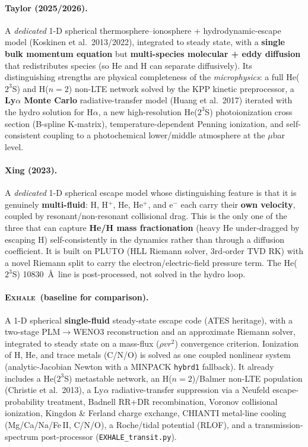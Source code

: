 \documentclass[11pt]{article}
\newcommand{\EXHALE}{\textsc{Exhale}}
\begin{document}
\paragraph{Taylor (2025/2026).} A \emph{dedicated} 1-D spherical thermosphere--ionosphere +
hydrodynamic-escape model (Koskinen et al.\ 2013/2022), integrated to steady state, with a
\textbf{single bulk momentum equation} but \textbf{multi-species molecular + eddy diffusion}
that redistributes species (so He and H can separate diffusively). Its distinguishing
strengths are physical completeness of the \emph{microphysics}: a full He($2^3$S) and
H($n{=}2$) non-LTE network solved by the KPP kinetic preprocessor, a \textbf{Ly$\alpha$
Monte Carlo} radiative-transfer model (Huang et al.\ 2017) iterated with the hydro solution
for H$\alpha$, a new high-resolution He($2^3$S) photoionization cross section (B-spline
K-matrix), temperature-dependent Penning ionization, and self-consistent coupling to a
photochemical lower/middle atmosphere at the $\mu$bar level.

\paragraph{Xing (2023).} A \emph{dedicated} 1-D spherical escape model whose distinguishing
feature is that it is genuinely \textbf{multi-fluid}: H, H$^+$, He, He$^+$, and e$^-$ each
carry their \textbf{own velocity}, coupled by resonant/non-resonant collisional drag. This
is the only one of the three that can capture \textbf{He/H mass fractionation} (heavy He
under-dragged by escaping H) self-consistently in the dynamics rather than through a
diffusion coefficient. It is built on PLUTO (HLL Riemann solver, 3rd-order TVD RK) with a
novel Riemann split to carry the electron/electric-field pressure term. The He($2^3$S)
10830~\AA\ line is post-processed, not solved in the hydro loop.

\paragraph{\EXHALE\ (baseline for comparison).} A 1-D spherical \textbf{single-fluid}
steady-state escape code (ATES heritage), with a two-stage PLM$\rightarrow$WENO3
reconstruction and an approximate Riemann solver, integrated to steady state on a mass-flux
($\rho v r^2$) convergence criterion. Ionization of H, He, and trace metals (C/N/O) is solved
as one coupled nonlinear system (analytic-Jacobian Newton with a MINPACK \texttt{hybrd1}
fallback). It already includes a He($2^3$S) metastable network, an H($n{=}2$)/Balmer non-LTE
population (Christie et al.\ 2013), a Ly$\alpha$ radiative-transfer suppression via a Neufeld
escape-probability treatment, Badnell RR+DR recombination, Voronov collisional ionization,
Kingdon \& Ferland charge exchange, CHIANTI metal-line cooling (Mg/Ca/Na/Fe\,II, C/N/O), a
Roche/tidal potential (RLOF), and a transmission-spectrum post-processor (\texttt{EXHALE\_transit.py}).
\end{document}
